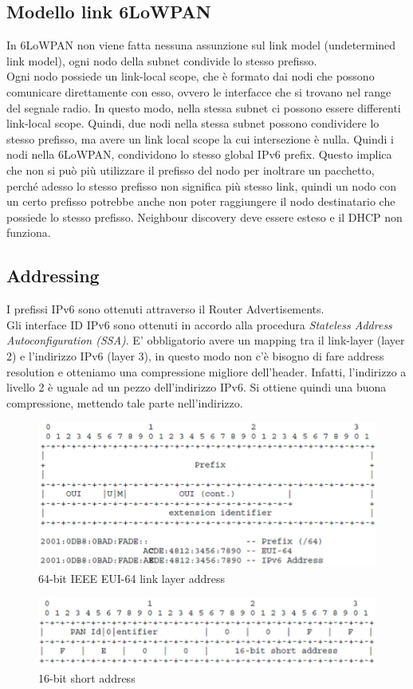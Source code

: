 \documentclass{article}
\begin{document}
\subsection{Modello link 6LoWPAN}
In 6LoWPAN non viene fatta nessuna assunzione sul link model (undetermined link model), ogni nodo della subnet condivide lo stesso prefisso. \\ Ogni nodo possiede un link-local scope, che è formato dai nodi che possono comunicare direttamente con esso, ovvero le interfacce che si trovano nel range del segnale radio. In questo modo, nella stessa subnet ci possono essere differenti link-local scope. Quindi, due nodi nella stessa subnet possono condividere lo stesso prefisso, ma avere un link local scope la cui intersezione è nulla. Quindi i nodi nella 6LoWPAN, condividono lo stesso global IPv6 prefix. Questo implica che non si può più utilizzare il prefisso del nodo per inoltrare un pacchetto, perché adesso lo stesso prefisso non significa più stesso link, quindi un nodo con un certo prefisso potrebbe anche non poter raggiungere il nodo destinatario che possiede lo stesso prefisso. Neighbour discovery deve essere esteso e il DHCP non funziona.

\subsection{Addressing}
I prefissi IPv6 sono ottenuti attraverso il Router Advertisements. \\ Gli interface ID IPv6 sono ottenuti in accordo alla procedura \textit{Stateless Address Autoconfiguration (SSA)}. E' obbligatorio avere un mapping tra il link-layer (layer 2) e l'indirizzo IPv6 (layer 3), in questo modo non c'è bisogno di fare address resolution e otteniamo una compressione migliore dell'header. Infatti, l'indirizzo a livello 2 è uguale ad un pezzo dell'indirizzo IPv6. Si ottiene quindi una buona compressione, mettendo tale parte nell'indirizzo.
\begin{figure}[H]
\centering
\includegraphics[scale=0.6]{figures/64bit link layer address.png}
\caption{64-bit IEEE EUI-64 link layer address}
\end{figure}
\begin{figure}[H]
\centering
\includegraphics[scale=0.6]{figures/16bit short address.png}
\caption{16-bit short address}
\end{figure}
\end{document}
